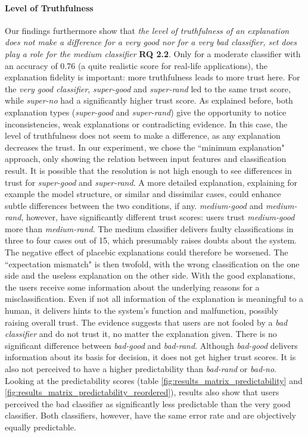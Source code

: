 \paragraph{Level of Truthfulness} 
Our findings furthermore show that \textit{the level of truthfulness of an explanation does not make a difference for a very good nor for a very bad classifier, set does play a role for the medium classifier} \textbf{RQ 2.2}. Only for a moderate classifier with an accuracy of 0.76 (a quite realistic score for real-life applications), the explanation fidelity is important: more truthfulness leads to more trust here.\newline
For the \textit{very good classifier}, \textit{super-good} and \textit{super-rand} led to the same trust score, while \textit{super-no} had a significantly higher trust score. As explained before, both explanation types (\textit{super-good} and \textit{super-rand}) give the opportunity to notice inconsistencies, weak explanations or contradicting evidence. In this case, the level of truthfulness does not seem to make a difference, as any explanation decreases the trust. In our experiment, we chose the ``minimum explanation" approach, only showing the relation between input features and classification result. It is possible that the resolution is not high enough to see differences in trust for \textit{super-good} and \textit{super-rand}. A more detailed explanation, explaining for example the model structure, or similar and dissimilar cases, could enhance subtle differences between the two conditions, if any.\newline
\textit{medium-good} and \textit{medium-rand}, however, have significantly different trust scores: users trust \textit{medium-good} more than \textit{medium-rand}. The medium classifier delivers faulty classifications in three to four cases out of 15, which presumably raises doubts about the system. The negative effect of placebic explanations could therefore be worsened. The ``expectation mismatch" is then twofold, with the wrong classification on the one side and the useless explanation on the other side. With the good explanations, the users receive some information about the underlying reasons for a misclassification. Even if not all information of the explanation is meaningful to a human, it delivers hints to the system's function and malfunction, possibly raising overall trust.\newline
The evidence suggests that users are not fooled by a \textit{bad classifier} and do not trust it, no matter the explanation given. There is no significant difference between \textit{bad-good} and \textit{bad-rand}. Although \textit{bad-good} delivers information about its basis for decision, it does not get higher trust scores. It is also not perceived to have a higher predictability than \textit{bad-rand} or \textit{bad-no}. Looking at the predictability scores (table \ref{fig:results_matrix_predictability} and \ref{fig:results_matrix_predictability_reordered}), results also show that users perceived the bad classifier as significantly less predictable than the very good classifier. Both classifiers, however, have the same error rate and are objectively equally predictable.\newline
